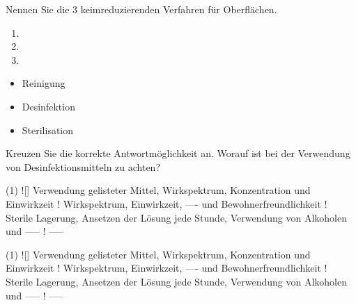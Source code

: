 \documentclass[a4paper]{scrartcl}
\begin{document}
\begin{aufgabe}{3}
	Nennen Sie die 3 keimreduzierenden Verfahren für Oberflächen.
	\begin{center}
		
		\begin{enumerate}
			\item {}
			\item {}
			\item {}
		\end{enumerate}
	\end{center}
	
	\begin{loesung}
		\begin{itemize}
			\item Reinigung
			\item Desinfektion
			\item Sterilisation
		\end{itemize}
	\end{loesung}
\end{aufgabe}

\begin{aufgabe}{1}
	Kreuzen Sie die korrekte Antwortmöglichkeit an. Worauf ist bei der Verwendung von Desinfektionsmitteln zu achten?
	\begin{center}
		\begin{mcumgebung}(1)
			\choice![\mcrichtig] Verwendung gelisteter Mittel, Wirkspektrum, Konzentration und Einwirkzeit
			\choice! Wirkspektrum, Einwirkzeit, ---- und Bewohnerfreundlichkeit
			\choice! Sterile Lagerung, Ansetzen der Lösung jede Stunde, Verwendung von Alkoholen und -----
			\choice! -----
		\end{mcumgebung}
	\end{center}
	
	\begin{loesung}
		\begin{mcumgebung}(1)
			\choice![\mcrichtig] Verwendung gelisteter Mittel, Wirkspektrum, Konzentration und Einwirkzeit
			\choice! Wirkspektrum, Einwirkzeit, ---- und Bewohnerfreundlichkeit
			\choice! Sterile Lagerung, Ansetzen der Lösung jede Stunde, Verwendung von Alkoholen und -----
			\choice! -----
		\end{mcumgebung}
	\end{loesung}
\end{aufgabe}
\end{document}
